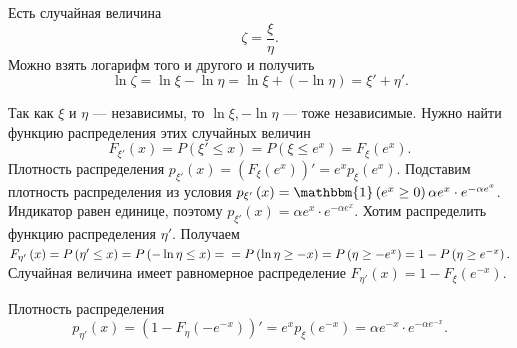 Есть случайная величина
$$ \zeta =
\frac{ \xi }{ \eta }.$$
Можно взять логарифм того и другого и получить
$$ \ln \zeta =
\ln \xi - \ln \eta =
\ln \xi + \left( - \ln \eta \right) =
\xi' + \eta'.$$

Так как $ \xi $ и $ \eta $ --- независимы, то $ \ln \xi, - \ln \eta $ --- тоже независимые.
Нужно найти функцию распределения этих случайных величин
$$F_{ \xi'} \left( x \right) =
P \left( \xi' \leq x \right) =
P \left( \xi \leq e^x \right) =
F_{ \xi } \left( e^x \right).$$
Плотность распределения $p_{ \xi'} \left( x \right) = \left( F_{ \xi } \left( e^x \right) \right)' = e^x p_{ \xi } \left( e^x \right) $.
Подставим плотность распределения из условия $p_{ \xi'} \left( x \right) = \mathbbm{1} \left( e^x \geq 0 \right) \alpha e^x \cdot e^{- \alpha e^x}$.
Индикатор равен единице, поэтому $p_{ \xi'} \left( x \right) = \alpha e^x \cdot e^{- \alpha e^x}$.
Хотим распределить функцию распределения $ \eta'$.
Получаем
$F_{ \eta'} \left( x \right) =
P \left( \eta' \leq x \right) =
P \left( - \ln \eta \leq x \right) = \\
= P \left( \ln \eta \geq -x \right) =
P \left( \eta \geq -e^x \right) =
1 - P \left( \eta \geq e^{-x} \right).$
Случайная величина имеет равномерное распределение $F_{ \eta'} \left( x \right) = 1 - F_{ \xi } \left( e^{-x} \right) $.

Плотность распределения
$$p_{ \eta'} \left( x \right) =
\left( 1 - F_{ \eta } \left( -e^{-x} \right) \right)' =
e^x p_{ \xi } \left( e^{-x} \right) =
\alpha e^{-x} \cdot e^{- \alpha e^{-x}}.$$

